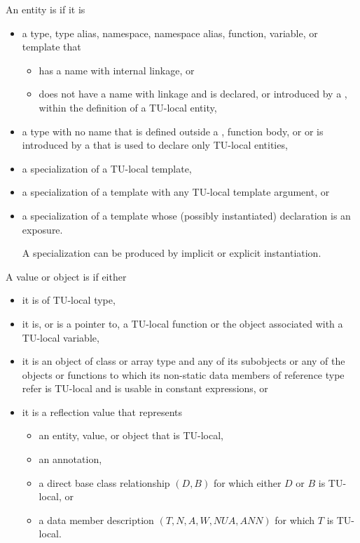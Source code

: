\pnum
An entity is  if it is
\begin{itemize}
\item
a type, type alias, namespace, namespace alias, function, variable, or template that
\begin{itemize}
\item
has a name with internal linkage, or
\item
does not have a name with linkage and is declared,
or introduced by a ,
within the definition of a TU-local entity,
\end{itemize}
\item
a type with no name that is defined outside a
,
function body, or
or is introduced by a 
that is used to declare only TU-local entities,
\item
a specialization of a TU-local template,
\item
a specialization of a template with any TU-local template argument, or
\item
a specialization of a template
whose (possibly instantiated) declaration is an exposure.
\begin{note}
A specialization can be produced by implicit or explicit instantiation.
\end{note}
\end{itemize}

\pnum
A value or object is  if either
\begin{itemize}
\item
it is of TU-local type,
\item
it is, or is a pointer to,
a TU-local function or the object associated with a TU-local variable,
\item
it is an object of class or array type and
any of its subobjects or
any of the objects or functions
to which its non-static data members of reference type refer
is TU-local and is usable in constant expressions, or
\item
it is a reflection value that represents
\begin{itemize}
\item
an entity, value, or object that is TU-local,
\item
an annotation,
\item
a direct base class relationship $(D, B)$
for which either $D$ or $B$ is TU-local, or
\item
a data member description $(T, N, A, W, \mathit{NUA}, \mathit{ANN})$
for which $T$ is TU-local.
\end{itemize}
\end{itemize}

